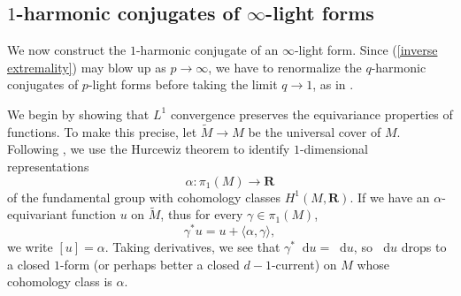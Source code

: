 \documentclass[reqno,11pt]{amsart}
\newcommand{\RR}{\mathbf{R}}
\newcommand*\dif{\mathop{}\!\mathrm{d}}
\theoremstyle{definition}
\numberwithin{equation}{section}
\begin{document}




\subsection{\texorpdfstring{$1$-harmonic conjugates of $\infty$-light forms}{One-harmonic conjugates of infinity-light forms}}
We now construct the $1$-harmonic conjugate of an $\infty$-light form.
Since (\ref{inverse extremality}) may blow up as $p \to \infty$, we have to renormalize the $q$-harmonic conjugates of $p$-light forms before taking the limit $q \to 1$, as in \cite[\S3.2]{daskalopoulos2020transverse}.

We begin by showing that $L^1$ convergence preserves the equivariance properties of functions.
To make this precise, let $\tilde M \to M$ be the universal cover of $M$.
Following \cite[\S4]{daskalopoulos2020transverse}, we use the Hurcewiz theorem to identify $1$-dimensional representations
$$\alpha: \pi_1(M) \to \RR$$
of the fundamental group with cohomology classes $H^1(M, \RR)$.
If we have an $\alpha$-equivariant function $u$ on $\tilde M$, thus for every $\gamma \in \pi_1(M)$,
$$\gamma^* u = u + \langle \alpha, \gamma\rangle,$$
we write $[u] = \alpha$.
Taking derivatives, we see that $\gamma^* \dif u = \dif u$, so $\dif u$ drops to a closed $1$-form (or perhaps better a closed $d-1$-current) on $M$ whose cohomology class is $\alpha$.
\end{document}
